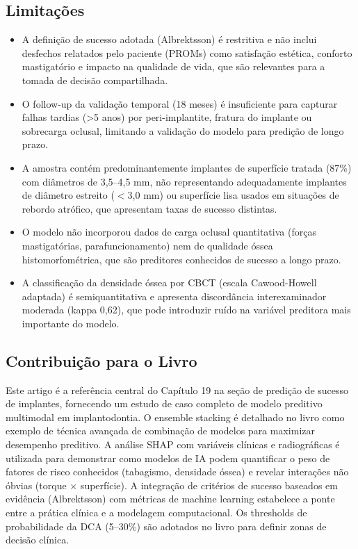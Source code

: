 \subsection{Limitações}
\begin{itemize}
  \item A definição de sucesso adotada (Albrektsson) é restritiva e não
        inclui desfechos relatados pelo paciente (PROMs) como
        satisfação estética, conforto mastigatório e impacto na
        qualidade de vida, que são relevantes para a tomada de decisão
        compartilhada.
  \item O follow-up da validação temporal (18 meses) é insuficiente para
        capturar falhas tardias (>5 anos) por peri-implantite, fratura
        do implante ou sobrecarga oclusal, limitando a validação do
        modelo para predição de longo prazo.
  \item A amostra contém predominantemente implantes de superfície
        tratada (87\%) com diâmetros de 3,5--4,5 mm, não
        representando adequadamente implantes de diâmetro estreito
        ($<$3,0 mm) ou superfície lisa usados em situações de rebordo
        atrófico, que apresentam taxas de sucesso distintas.
  \item O modelo não incorporou dados de carga oclusal quantitativa
        (forças mastigatórias, parafuncionamento) nem de qualidade
        óssea histomorfométrica, que são preditores conhecidos de
        sucesso a longo prazo.
  \item A classificação da densidade óssea por CBCT (escala
        Cawood-Howell adaptada) é semiquantitativa e apresenta
        discordância interexaminador moderada (kappa 0,62), que pode
        introduzir ruído na variável preditora mais importante do modelo.
\end{itemize}

\subsection{Contribuição para o Livro}
Este artigo é a referência central do Capítulo 19 na seção de predição
de sucesso de implantes, fornecendo um estudo de caso completo de modelo
preditivo multimodal em implantodontia. O ensemble stacking é detalhado
no livro como exemplo de técnica avançada de combinação de modelos para
maximizar desempenho preditivo. A análise SHAP com variáveis clínicas
e radiográficas é utilizada para demonstrar como modelos de IA podem
quantificar o peso de fatores de risco conhecidos (tabagismo, densidade
óssea) e revelar interações não óbvias (torque $\times$ superfície). A
integração de critérios de sucesso baseados em evidência (Albrektsson)
com métricas de machine learning estabelece a ponte entre a prática
clínica e a modelagem computacional. Os thresholds de probabilidade da
DCA (5--30\%) são adotados no livro para definir zonas de decisão
clínica.

